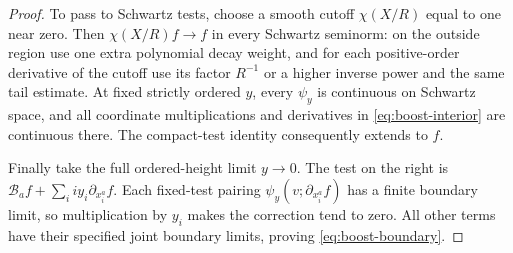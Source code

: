 \begin{proof}
To pass to Schwartz tests, choose a smooth cutoff $\chi(X/R)$ equal to
one near zero. Then $\chi(X/R)f\to f$ in every Schwartz seminorm: on the
outside region use one extra polynomial decay weight, and for each
positive-order derivative of the cutoff use its factor $R^{-1}$ or a
higher inverse power and the same tail estimate. At fixed strictly ordered
$y$, every $\psi_y$ is continuous on Schwartz space, and all coordinate
multiplications and derivatives in \eqref{eq:boost-interior} are continuous
there. The compact-test identity consequently extends to $f$.

Finally take the full ordered-height limit $y\to0$. The test on the
right is $\mathcal B_af+\sum_i iy_i\partial_{x_i^a}f$. Each fixed-test
pairing $\psi_y(v;\partial_{x_i^a}f)$ has a finite boundary limit, so
multiplication by $y_i$ makes the correction tend to zero. All other terms
have their specified joint boundary limits, proving
\eqref{eq:boost-boundary}.
\end{proof}

